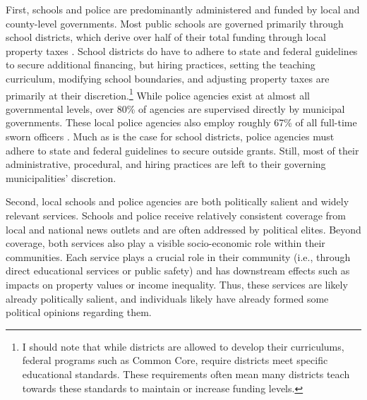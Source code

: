 First, schools and police are predominantly administered and funded by local and county-level governments. Most public schools are governed primarily through school districts, which derive over half of their total funding through local property taxes \citep{urbaninstituteStateLocalFinance2020}. School districts do have to adhere to state and federal guidelines to secure additional financing, but hiring practices, setting the teaching curriculum, modifying school boundaries, and adjusting property taxes are primarily at their discretion.\footnote{I should note that while districts are allowed to develop their curriculums, federal programs such as Common Core, require districts meet specific educational standards. These requirements often mean many districts teach towards these standards to maintain or increase funding levels.} While police agencies exist at almost all governmental levels, over 80\% of agencies are supervised directly by municipal governments. These local police agencies also employ roughly 67\% of all full-time sworn officers \citep{bureauofjusticestatisticsLocalPoliceDepartments2019}. Much as is the case for school districts, police agencies must adhere to state and federal guidelines to secure outside grants. Still, most of their administrative, procedural, and hiring practices are left to their governing municipalities' discretion.

Second, local schools and police agencies are both politically salient and widely relevant services. Schools and police receive relatively consistent coverage from local and national news outlets and are often addressed by political elites. Beyond coverage, both services also play a visible socio-economic role within their communities. Each service plays a crucial role in their community (i.e., through direct educational services or public safety) and has downstream effects such as impacts on property values or income inequality. Thus, these services are likely already politically salient, and individuals likely have already formed some political opinions regarding them.

